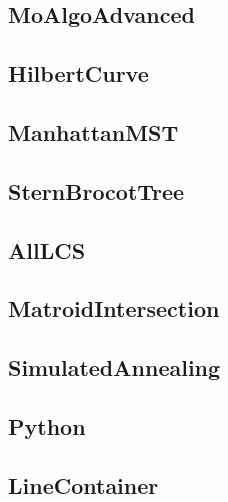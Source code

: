 \subsection{MoAlgoAdvanced}

\subsection{HilbertCurve}

\subsection{ManhattanMST}

\subsection{SternBrocotTree}

\subsection{AllLCS}

\subsection{MatroidIntersection}

\subsection{SimulatedAnnealing}

\subsection{Python}

\subsection{LineContainer}


